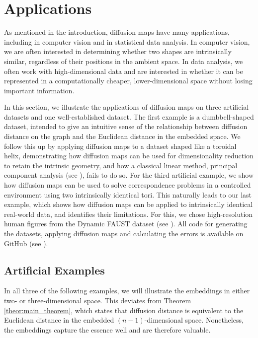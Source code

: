 \section{Applications}\label{sec:three}

As mentioned in the introduction, diffusion maps have many applications, including in computer vision and in statistical data analysis. In computer vision, we are often interested in determining whether two shapes are intrinsically similar, regardless of their positions in the ambient space. In data analysis, we often work with high-dimensional data and are interested in whether it can be represented in a computationally cheaper, lower-dimensional space without losing important information. 

In this section, we illustrate the applications of diffusion maps on three artificial datasets and one well-established dataset. The first example is a dumbbell-shaped dataset, intended to give an intuitive sense of the relationship between diffusion distance on the graph and the Euclidean distance in the embedded space. We follow this up by applying diffusion maps to a dataset shaped like a toroidal helix, demonstrating how diffusion maps can be used for dimensionality reduction to retain the intrinsic geometry, and how a classical linear method, principal component analysis (see \cite[Section~1.1]{PCA}), fails to do so. For the third artificial example, we show how diffusion maps can be used to solve correspondence problems in a controlled environment using two intrinsically identical tori. This naturally leads to our last example, which shows how diffusion maps can be applied to intrinsically identical real-world data, and identifies their limitations. For this, we chose high-resolution human figures from the Dynamic FAUST dataset (see \cite{FAUST}). All code for generating the datasets, applying diffusion maps and calculating the errors is available on GitHub (see \cite{git}).

\subsection{Artificial Examples}\label{subsec:artif}
In all three of the following examples, we will illustrate the embeddings in either two- or three-dimensional space. This deviates from Theorem \ref{theor:main_theorem}, which states that diffusion distance is equivalent to the Euclidean distance in the embedded $(n-1)$-dimensional space. Nonetheless, the embeddings capture the essence well and are therefore valuable.

